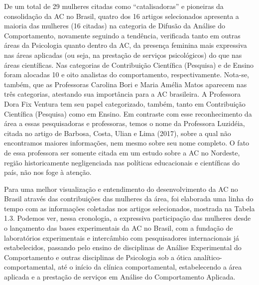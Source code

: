 De um total de 29 mulheres citadas como “catalisadoras” e pioneiras da consolidação da AC no Brasil, quatro dos 16 artigos selecionados apresenta a maioria das mulheres (16 citadas) na categoria de Difusão da Análise do Comportamento, novamente seguindo a tendência, verificada tanto em outras áreas da Psicologia quanto dentro da AC, da presença feminina mais expressiva nas áreas aplicadas (ou seja, na prestação de serviços psicológicos) do que nas áreas científicas. Nas categorias de Contribuição Científica (Pesquisa) e de Ensino foram alocadas 10 e oito analistas do comportamento, respectivamente. Nota-se, também, que as Professoras Carolina Bori e Maria Amélia Matos aparecem nas três categorias, atestando sua importância para a AC brasileira. A Professora Dora Fix Ventura tem seu papel categorizado, também, tanto em Contribuição Científica (Pesquisa) como em Ensino. Em contraste com esse reconhecimento da área a essas pesquisadoras e professoras, temos o nome da Professora Luzidéia, citada no artigo de Barbosa, Costa, Ulian e Lima (2017), sobre a qual não encontramos maiores informações, nem mesmo sobre seu nome completo. O fato de essa professora ser somente citada em um estudo sobre a AC no Nordeste, região historicamente negligenciada nas políticas educacionais e científicas do país, não nos foge à atenção.

Para uma melhor visualização e entendimento do desenvolvimento da AC no Brasil através das contribuições das mulheres da área, foi elaborada uma linha do tempo com as informações coletadas nos artigos selecionados, mostrada na Tabela 1.3. Podemos ver, nessa cronologia, a expressiva participação das mulheres desde o lançamento das bases experimentais da AC no Brasil, com a fundação de laboratórios experimentais e intercâmbio com pesquisadores internacionais já estabelecidos, passando pelo ensino de disciplinas de Análise Experimental do Comportamento e outras disciplinas de Psicologia sob a ótica analítico-comportamental, até o início da clínica comportamental, estabelecendo a área aplicada e a prestação de serviços em Análise do Comportamento Aplicada.
\vfill
\pagebreak

